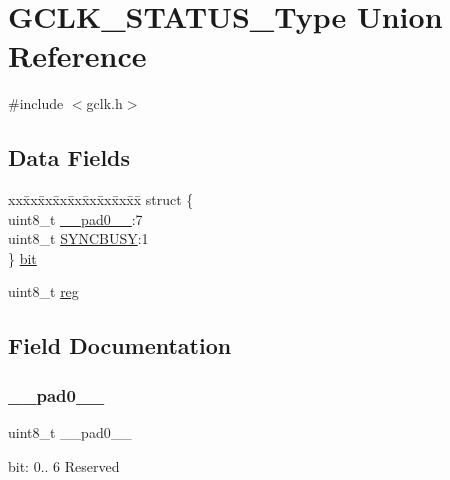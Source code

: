 \hypertarget{union_g_c_l_k___s_t_a_t_u_s___type}{}\section{G\+C\+L\+K\+\_\+\+S\+T\+A\+T\+U\+S\+\_\+\+Type Union Reference}
\label{union_g_c_l_k___s_t_a_t_u_s___type}


{\ttfamily \#include $<$gclk.\+h$>$}

\subsection*{Data Fields}
\begin{DoxyCompactItemize}
\item 
\begin{tabbing}
xx\=xx\=xx\=xx\=xx\=xx\=xx\=xx\=xx\=\kill
struct \{\\
\>uint8\_t \mbox{\hyperlink{union_g_c_l_k___s_t_a_t_u_s___type_a8b4eebe79ded0459acec2f4950102ba3}{\_\_pad0\_\_}}:7\\
\>uint8\_t \mbox{\hyperlink{union_g_c_l_k___s_t_a_t_u_s___type_abb30254758e23bd24824e436a1aa8716}{SYNCBUSY}}:1\\
\} \mbox{\hyperlink{union_g_c_l_k___s_t_a_t_u_s___type_ab356ae08525a521fe20bb1f5a7f3d5f9}{bit}}\\

\end{tabbing}\item 
uint8\+\_\+t \mbox{\hyperlink{union_g_c_l_k___s_t_a_t_u_s___type_a9428adc9af4653a2050e2536b55dec8d}{reg}}
\end{DoxyCompactItemize}


\subsection{Field Documentation}
\mbox{\label{union_g_c_l_k___s_t_a_t_u_s___type_a8b4eebe79ded0459acec2f4950102ba3}} 
\subsubsection{\texorpdfstring{\_\_pad0\_\_}{\_\_pad0\_\_}}
{\footnotesize\ttfamily uint8\+\_\+t \+\_\+\+\_\+pad0\+\_\+\+\_\+}

bit\+: 0.. 6 Reserved \mbox{\label{union_g_c_l_k___s_t_a_t_u_s___type_ab356ae08525a521fe20bb1f5a7f3d5f9}} 
